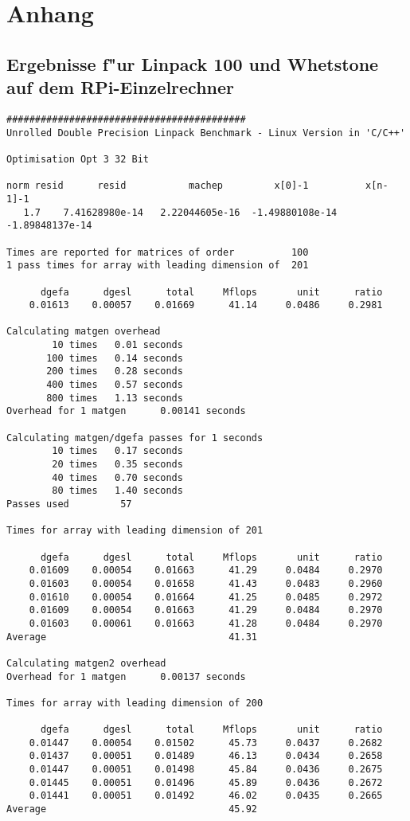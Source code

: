 \chapter{Anhang}\label{Kapitel 6}
\section{Ergebnisse f"ur Linpack 100 und Whetstone auf dem RPi-Einzelrechner}\label{Ergebnisse_RPi}
\begin{verbatim}
##########################################
Unrolled Double Precision Linpack Benchmark - Linux Version in 'C/C++'

Optimisation Opt 3 32 Bit

norm resid      resid           machep         x[0]-1          x[n-1]-1
   1.7    7.41628980e-14   2.22044605e-16  -1.49880108e-14  -1.89848137e-14

Times are reported for matrices of order          100
1 pass times for array with leading dimension of  201

      dgefa      dgesl      total     Mflops       unit      ratio
    0.01613    0.00057    0.01669      41.14     0.0486     0.2981

Calculating matgen overhead
        10 times   0.01 seconds
       100 times   0.14 seconds
       200 times   0.28 seconds
       400 times   0.57 seconds
       800 times   1.13 seconds
Overhead for 1 matgen      0.00141 seconds

Calculating matgen/dgefa passes for 1 seconds
        10 times   0.17 seconds
        20 times   0.35 seconds
        40 times   0.70 seconds
        80 times   1.40 seconds
Passes used         57 

Times for array with leading dimension of 201

      dgefa      dgesl      total     Mflops       unit      ratio
    0.01609    0.00054    0.01663      41.29     0.0484     0.2970
    0.01603    0.00054    0.01658      41.43     0.0483     0.2960
    0.01610    0.00054    0.01664      41.25     0.0485     0.2972
    0.01609    0.00054    0.01663      41.29     0.0484     0.2970
    0.01603    0.00061    0.01663      41.28     0.0484     0.2970
Average                                41.31

Calculating matgen2 overhead
Overhead for 1 matgen      0.00137 seconds

Times for array with leading dimension of 200

      dgefa      dgesl      total     Mflops       unit      ratio
    0.01447    0.00054    0.01502      45.73     0.0437     0.2682
    0.01437    0.00051    0.01489      46.13     0.0434     0.2658
    0.01447    0.00051    0.01498      45.84     0.0436     0.2675
    0.01445    0.00051    0.01496      45.89     0.0436     0.2672
    0.01441    0.00051    0.01492      46.02     0.0435     0.2665
Average                                45.92


\end{verbatim}
